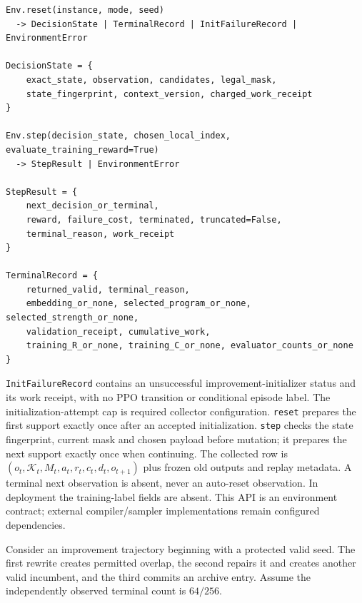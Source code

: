 \documentclass[10pt,a4paper]{article}
\begin{document}
\begin{verbatim}
Env.reset(instance, mode, seed)
  -> DecisionState | TerminalRecord | InitFailureRecord | EnvironmentError

DecisionState = {
    exact_state, observation, candidates, legal_mask,
    state_fingerprint, context_version, charged_work_receipt
}

Env.step(decision_state, chosen_local_index, evaluate_training_reward=True)
  -> StepResult | EnvironmentError

StepResult = {
    next_decision_or_terminal,
    reward, failure_cost, terminated, truncated=False,
    terminal_reason, work_receipt
}

TerminalRecord = {
    returned_valid, terminal_reason,
    embedding_or_none, selected_program_or_none, selected_strength_or_none,
    validation_receipt, cumulative_work,
    training_R_or_none, training_C_or_none, evaluator_counts_or_none
}
\end{verbatim}

\texttt{InitFailureRecord} contains an unsuccessful
improvement-initializer status and its work receipt, with no PPO
transition or conditional episode label. The initialization-attempt cap
is required collector configuration. \texttt{reset} prepares the first
support exactly once after an accepted initialization. \texttt{step}
checks the state fingerprint, current mask and chosen payload before
mutation; it prepares the next support exactly once when continuing. The
collected row is \((o_t,\mathcal K_t,M_t,a_t,r_t,c_t,d_t,o_{t+1})\) plus
frozen old outputs and replay metadata. A terminal next observation is
absent, never an auto-reset observation. In deployment the
training-label fields are absent. This API is an environment contract;
external compiler/sampler implementations remain configured
dependencies.

Consider an improvement trajectory beginning with a protected valid
seed. The first rewrite creates permitted overlap, the second repairs it
and creates another valid incumbent, and the third commits an archive
entry. Assume the independently observed terminal count is \(64/256\).

\begingroup\small
\end{document}
